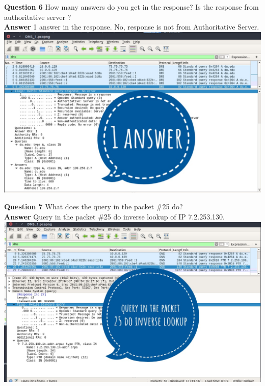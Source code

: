 \documentclass[14pt]{extarticle}
\begin{document}
    \noindent
    \textbf{\large Question 6}
    How many answers do you get in the response? Is the response from authoritative server ?\\[10pt]
    \textbf{\large Answer}
    1 answer in the response. No, response is not from Authoritative Server.\\[10pt]
    \includegraphics[scale=0.45]{1_6}
    \vspace{1cm}

    \noindent
    \textbf{\large Question 7}
    What does the query in the packet \#25 do?\\[10pt]
    \textbf{\large Answer}
    Query in the packet \#25 do inverse lookup of IP 7.2.253.130.\\[10pt]
    \includegraphics[scale=0.45]{1_7}
    \vspace{1cm}
\end{document}
